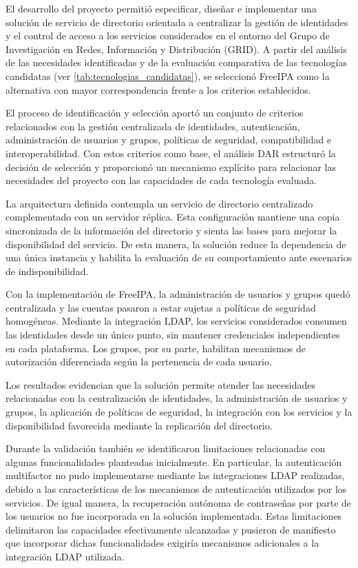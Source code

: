 \label{cap:conclusiones}
\vspace*{0.7cm}

El desarrollo del proyecto permitió especificar, diseñar e implementar una solución de servicio de directorio orientada a centralizar la gestión de identidades y el control de acceso a los servicios considerados en el entorno del Grupo de Investigación en Redes, Información y Distribución (GRID). A partir del análisis de las necesidades identificadas y de la evaluación comparativa de las tecnologías candidatas (ver \autoref{tab:tecnologias_candidatas}), se seleccionó FreeIPA como la alternativa con mayor correspondencia frente a los criterios establecidos.

El proceso de identificación y selección aportó un conjunto de criterios relacionados con la gestión centralizada de identidades, autenticación, administración de usuarios y grupos, políticas de seguridad, compatibilidad e interoperabilidad. Con estos criterios como base, el análisis DAR estructuró la decisión de selección y proporcionó un mecanismo explícito para relacionar las necesidades del proyecto con las capacidades de cada tecnología evaluada.

La arquitectura definida contempla un servicio de directorio centralizado complementado con un servidor réplica. Esta configuración mantiene una copia sincronizada de la información del directorio y sienta las bases para mejorar la disponibilidad del servicio. De esta manera, la solución reduce la dependencia de una única instancia y habilita la evaluación de su comportamiento ante escenarios de indisponibilidad.

Con la implementación de FreeIPA, la administración de usuarios y grupos quedó centralizada y las cuentas pasaron a estar sujetas a políticas de seguridad homogéneas. Mediante la integración LDAP, los servicios considerados consumen las identidades desde un único punto, sin mantener credenciales independientes en cada plataforma. Los grupos, por su parte, habilitan mecanismos de autorización diferenciada según la pertenencia de cada usuario.

Los resultados evidencian que la solución permite atender las necesidades relacionadas con la centralización de identidades, la administración de usuarios y grupos, la aplicación de políticas de seguridad, la integración con los servicios y la disponibilidad favorecida mediante la replicación del directorio.

Durante la validación también se identificaron limitaciones relacionadas con algunas funcionalidades planteadas inicialmente. En particular, la autenticación multifactor no pudo implementarse mediante las integraciones LDAP realizadas, debido a las características de los mecanismos de autenticación utilizados por los servicios. De igual manera, la recuperación autónoma de contraseñas por parte de los usuarios no fue incorporada en la solución implementada. Estas limitaciones delimitaron las capacidades efectivamente alcanzadas y pusieron de manifiesto que incorporar dichas funcionalidades exigiría mecanismos adicionales a la integración LDAP utilizada.

